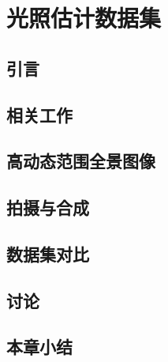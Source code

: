 \chapter{光照估计数据集}

\section{引言}
\section{相关工作}
\section{高动态范围全景图像}
\section{拍摄与合成}
\section{数据集对比}
\section{讨论}
\section{本章小结}